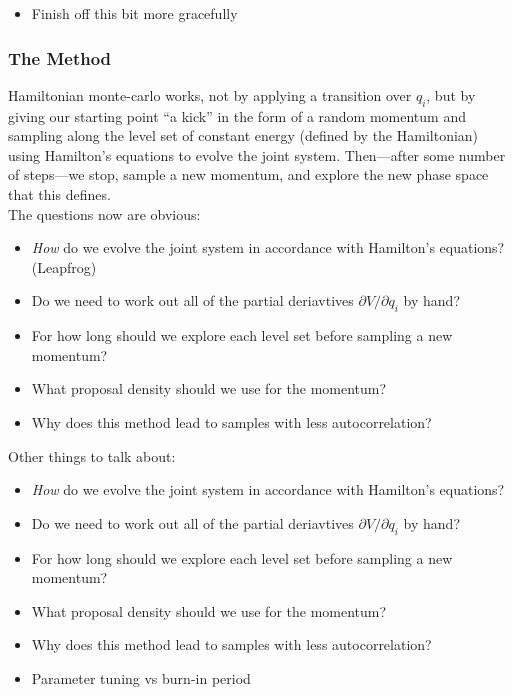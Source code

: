 \documentclass{article}
\begin{document}
\begin{itemize}
  \item Finish off this bit more gracefully
\end{itemize}

\subsubsection{The Method}
Hamiltonian monte-carlo works, not by applying a transition over $q_i$, but by giving our starting point ``a kick'' in the form of a random momentum and sampling along the level set of constant energy (defined by the Hamiltonian) using Hamilton's equations to evolve the joint system. Then---after some number of steps---we stop, sample a new momentum, and explore the new phase space that this defines. \\

The questions now are obvious:

\begin{itemize}
\item \emph{How} do we evolve the joint system in accordance with Hamilton's equations? (Leapfrog)
\item Do we need to work out all of the partial deriavtives $\partial V/\partial q_i$ by hand? 
\item For how long should we explore each level set before sampling a new momentum?
\item What proposal density should we use for the momentum?
\item Why does this method lead to samples with less autocorrelation?
\end{itemize}

Other things to talk about:
\begin{itemize}
\item \emph{How} do we evolve the joint system in accordance with Hamilton's equations?
\item Do we need to work out all of the partial deriavtives $\partial V/\partial q_i$ by hand? 
\item For how long should we explore each level set before sampling a new momentum?
\item What proposal density should we use for the momentum?
\item Why does this method lead to samples with less autocorrelation?
\item Parameter tuning vs burn-in period
\end{itemize}
\end{document}
